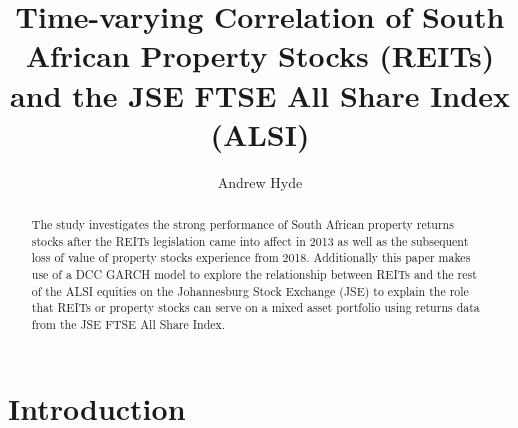 \documentclass[11pt,preprint, authoryear]{elsarticle}
\numberwithin{equation}{section}
\numberwithin{figure}{section}
\numberwithin{table}{section}
\begin{document}
\begin{frontmatter}  %

\title{Time-varying Correlation of South African Property Stocks (REITs)
and the JSE FTSE All Share Index (ALSI)}





\author[Add1]{Andrew Hyde}





\address[Add1]{Stellenbosch University, South Africa}


\begin{abstract}
\small{
The study investigates the strong performance of South African property
returns stocks after the REITs legislation came into affect in 2013 as
well as the subsequent loss of value of property stocks experience from
2018. Additionally this paper makes use of a DCC GARCH model to explore
the relationship between REITs and the rest of the ALSI equities on the
Johannesburg Stock Exchange (JSE) to explain the role that REITs or
property stocks can serve on a mixed asset portfolio using returns data
from the JSE FTSE All Share Index.
}
\end{abstract}

\vspace{1cm}





\vspace{0.5cm}

\end{frontmatter}



\pagestyle{fancy}
\chead{}
\rhead{}
\lfoot{}
\lhead{}
\cfoot{}


\headsep 35pt %




\hypertarget{introduction}{%
\section{\texorpdfstring{Introduction
\label{Introduction}}{Introduction }}\label{introduction}}
\end{document}
